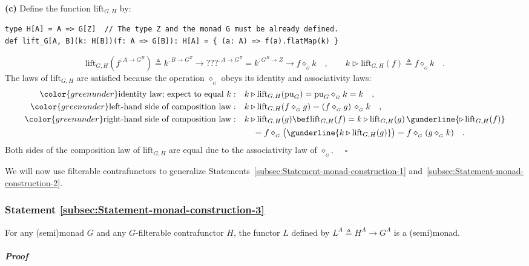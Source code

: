 \textbf{(c)} Define the function $\text{lift}_{G,H}$ by:
\begin{lstlisting}
type H[A] = A => G[Z]  // The type Z and the monad G must be already defined.
def lift_G[A, B](k: H[B])(f: A => G[B]): H[A] = { (a: A) => f(a).flatMap(k) }
\end{lstlisting}
\[
\text{lift}_{G,H}(f^{:A\rightarrow G^{B}})\triangleq k^{:B\rightarrow G^{Z}}\rightarrow\text{???}^{:A\rightarrow G^{Z}}=k^{:G^{B}\rightarrow Z}\rightarrow f\diamond_{_{G}}k\quad,\quad\quad k\triangleright\text{lift}_{G,H}(f)\triangleq f\diamond_{_{G}}k\quad.
\]
The laws of $\text{lift}_{G,H}$ are satisfied because the operation
$\diamond_{_{G}}$ obeys its identity and associativity laws:
\begin{align*}
{\color{greenunder}\text{identity law; expect to equal }k:}\quad & k\triangleright\text{lift}_{G,H}(\text{pu}_{G})=\text{pu}_{G}\diamond_{_{G}}k=k\quad,\\
{\color{greenunder}\text{left-hand side of composition law}:}\quad & k\triangleright\text{lift}_{G,H}(f\diamond_{_{G}}g)=(f\diamond_{_{G}}g)\,\diamond_{_{G}}k\quad,\\
{\color{greenunder}\text{right-hand side of composition law}:}\quad & k\triangleright\text{lift}_{G,H}(g)\bef\text{lift}_{G,H}(f)=k\triangleright\text{lift}_{G,H}(g)\,\gunderline{\triangleright\,\text{lift}_{G,H}(f)}\\
 & \quad=f\diamond_{_{G}}\big(\gunderline{k\triangleright\text{lift}_{G,H}(g)}\big)=f\diamond_{_{G}}(g\diamond_{_{G}}k)\quad.
\end{align*}
Both sides of the composition law of $\text{lift}_{G,H}$ are equal
due to the associativity law of $\diamond_{_{G}}$. $\quad$$\square$

We will now use filterable contrafunctors to generalize Statements~\ref{subsec:Statement-monad-construction-1}
and~\ref{subsec:Statement-monad-construction-2}.

\subsubsection{Statement \label{subsec:Statement-monad-construction-3}\ref{subsec:Statement-monad-construction-3}}

For any (semi)monad $G$ and any $G$-filterable contrafunctor $H$,
the functor $L$ defined by $L^{A}\triangleq H^{A}\rightarrow G^{A}$
is a (semi)monad.

\subparagraph{Proof}

